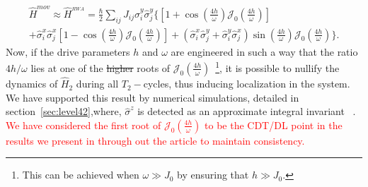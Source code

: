 \documentclass[12pt]{iopart}
\newcommand{\red}[1]{\textcolor{red}{#1}}
\begin{document}
\begin{multline}
\hat{H}^{mov}\approx \hat{H}^{_{RWA}} = \frac{\hbar}{2}\sum_{ij} J_{ij} \hat{\sigma}^y_i\hat{\sigma}^y_j\Bigg\{\left[1+\cos(\frac{4h}{\omega})\mathcal{J}_0\left(\frac{4h}{\omega}\right)\right] \\
+ \hat{\sigma}^x_i\hat{\sigma}^x_j \left[1-\cos(\frac{4h}{\omega})\mathcal{J}_0\left(\frac{4h}{\omega}\right)\right]
+ \left(\hat{\sigma}^x_i\hat{\sigma}^y_j+\hat{\sigma}^y_i\hat{\sigma}^x_j\right)\sin(\frac{4h}{\omega})\mathcal{J}_0\left(\frac{4h}{\omega}\right) \Bigg\}.
\label{eq:movham1}
\end{multline}
Now, if the drive parameters $h$ and $\omega$  are engineered in such a way that the ratio ${4h}/{\omega}$ lies at one of the \sout{higher} roots of $\mathcal{J}_0\left(\frac{4h}{\omega}\right)$~\footnote{This can be achieved when $\omega \gg J_0$ by ensuring that $h\gg J_0$.}, it is possible to nullify the dynamics of $\hat{H}_2$ during all $T_2-$cycles, thus inducing localization in the system. We have supported this result by numerical simulations, detailed in section~\ref{sec:level42},where, $\hat{\sigma}^z$ is detected as an approximate integral invariant ~\cite{Keser2016,Dodonov1978}. \red{We have considered the first root of $\mathcal{J}_0\left(\frac{4h}{\omega}\right)$ to be the CDT/DL point in the results we present in through out the article to maintain consistency.}
\end{document}
